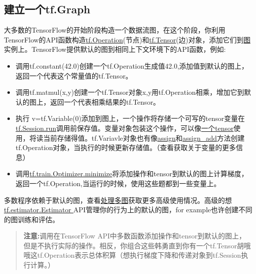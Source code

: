 \subsection{建立一个tf.Graph}
大多数的TensorFlow的开始阶段构造一个数据流图，在这个阶段，你利用TensorFlow的API函数构造\href{https://www.tensorflow.org/api_docs/python/tf/Operation?hl=zh-cn}{tf.Operation}(节点)和\href{https://www.tensorflow.org/api_docs/python/tf/Tensor?hl=zh-cn}{tf.Tensor}(边)对象，添加它们到\href{https://www.tensorflow.org/api_docs/python/tf/Graph?hl=zh-cn}{图}实例上。TensorFlow提供默认的图到相同上下文环境下的API函数，例如:
\begin{itemize}
\item 调用tf.constant(42.0)创建一个tf.Operation生成值42.0,添加值到默认的图上，返回一个代表这个常量值的tf.Tensor。
\item 调用tf.matmul(x,y)创建一个tf.Tensor对象x,y用tf.Operation相乘，增加它到默认的图上，返回一个代表相乘结果的tf.Tensor。
\item 执行 v=tf.Variable(0)添加到图上，一个操作将存储一个可写的tensor变量在\href{https://www.tensorflow.org/api_docs/python/tf/Session?hl=zh-cn#run}{tf.Session.run}调用前保存值。变量对象包装这个操作，可以像\href{https://www.tensorflow.org/programmers_guide/graphs?hl=zh-cn#tensor-like-objects}{一个tensor}使用，将读当前存储得值。tf.Variavle对象也有像\href{https://www.tensorflow.org/api_docs/python/tf/Variable?hl=zh-cn#assign}{assign}和\href{https://www.tensorflow.org/api_docs/python/tf/Variable?hl=zh-cn#assign_add}{assign\_add}方法创建tf.Operation对象，当执行的时候更新存储值。（查看获取关于变量的更多信息）
\item 调用\href{https://www.tensorflow.org/api_docs/python/tf/train/Optimizer?hl=zh-cn#minimize}{tf.train.Optimizer.minimize}将添加操作和tensor到默认的图上计算梯度，返回一个tf.Operation,当运行的时候，使用这些题都到一些变量上。
\end{itemize}
多数程序依赖于默认的图，查看\href{https://www.tensorflow.org/programmers_guide/graphs?hl=zh-cn#dealing_with_multiple_graphs}{处理多图}获取更多高级使用情况。高级的想\href{https://www.tensorflow.org/api_docs/python/tf/estimator/Estimator?hl=zh-cn}{ tf.estimator.Estimator }API管理你的行为上的默认的图，for example也许创建不同的图训练和评估。
\begin{quote}
	\textbf{注意:}调用在TensorFlow API中多数函数添加操作和tensor到默认的图上，但是不执行实际的操作。相反，你组合这些韩勇直到你有一个tf.Tensor胡哦哦这tf.Operation表示总体积算（想执行梯度下降和传递对象到tf.Session执行计算。）
\end{quote}
